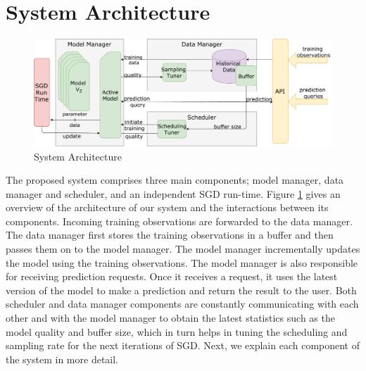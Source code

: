 \documentclass{vldb}
\begin{document}
\section{System Architecture} \label{sec:system-architecutre}
\begin{figure}[t]
\centering
\includegraphics[width=\columnwidth]{../images/system-architecture-6.pdf}
\caption{System Architecture}
\label{fig:system-architecture}
\end{figure}

The proposed system comprises three main components; model manager, data manager and scheduler, and an independent SGD run-time. 
Figure \ref{fig:system-architecture} gives an overview of the architecture of our system and the interactions between its components.
Incoming training observations are forwarded to the data manager.
The data manager first stores the training observations in a buffer and then passes them on to the model manager.
The model manager incrementally updates the model using the training observations.
The model manager is also responsible for receiving prediction requests.
Once it receives a request, it uses the latest version of the model to make a prediction and return the result to the user.
Both scheduler and data manager components are constantly communicating with each other and with the model manager to obtain the latest statistics such as the model quality and buffer size, which in turn helps in tuning the scheduling and sampling rate for the next iterations of SGD. 
Next, we explain each component of the system in more detail.
\end{document}
